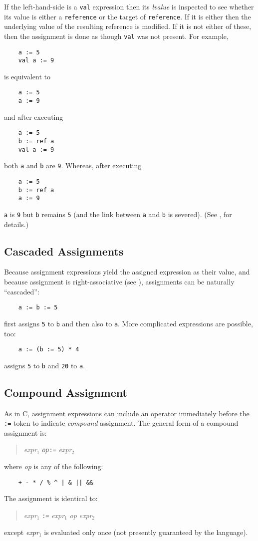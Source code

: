 If the left-hand-side is a {\tt val} expression then its {\em lvalue}
is inspected to see whether its value is either a {\tt reference} or
the target of {\tt reference}.  If it is either 
then the underlying value of the resulting reference is modified.
If it is not either of these, then the assignment is done as though 
{\tt val} was not present.
For example,
\begin{verbatim}
    a := 5
    val a := 9
\end{verbatim}
is equivalent to
\begin{verbatim}
    a := 5
    a := 9
\end{verbatim}
and after executing
\begin{verbatim}
    a := 5
    b := ref a
    val a := 9
\end{verbatim}
both {\tt a} and {\tt b} are {\tt 9}.  Whereas,  after executing
\begin{verbatim}
    a := 5
    b := ref a
    a := 9
\end{verbatim}
{\tt a} is {\tt 9} but {\tt b} remains {\tt 5} (and the link between
{\tt a} and {\tt b} is severed).  (See , for details.)

\subsection{Cascaded Assignments}
\label{assignment-cascading}

Because assignment expressions yield the assigned expression as their
value, and because assignment is right-associative (see ),
assignments can be naturally ``cascaded'':
\begin{verbatim}
    a := b := 5
\end{verbatim}
first assigns {\tt 5} to {\tt b} and then also to {\tt a}.  More
complicated expressions are possible, too:
\begin{verbatim}
    a := (b := 5) * 4
\end{verbatim}
assigns {\tt 5} to {\tt b} and {\tt 20} to {\tt a}.

\subsection{Compound Assignment}

As in C, assignment expressions can include an operator immediately
before the {\tt :=} token to indicate {\em compound} assignment.  The
general form of a compound assignment is:
\begin{quote}
    {\em expr$_1$} {\tt{\em op}:=} {\em expr$_2$}
\end{quote}
where {\em op} is any of the following:
\begin{verbatim}
    + - * / % ^ | & || &&
\end{verbatim}
The assignment is identical to:
\begin{quote}
    {\em expr$_1$} {\tt :=} {\em expr$_1$} {\em op} {\em expr$_2$}
\end{quote}
except {\em expr$_1$} is evaluated only once (not presently
guaranteed by the language).

